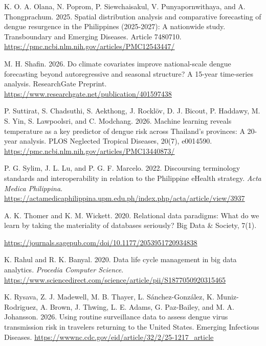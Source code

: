 \documentclass[
]{article}
\begin{document}
K. O. A. Olana, N. Poprom, P. Siewchaisakul, V. Punyapornwithaya, and A.
Thongprachum. 2025. Spatial distribution analysis and comparative
forecasting of dengue resurgence in the Philippines (2025-2027): A
nationwide study. Transboundary and Emerging Diseases. Article 7480710.
\href{https://pmc.ncbi.nlm.nih.gov/articles/PMC12543447/}{\ul{https://pmc.ncbi.nlm.nih.gov/articles/PMC12543447/}}

M. H. Shafin. 2026. Do climate covariates improve national-scale dengue
forecasting beyond autoregressive and seasonal structure? A 15-year
time-series analysis. ResearchGate Preprint.
\href{https://www.researchgate.net/publication/401597438}{\ul{https://www.researchgate.net/publication/401597438}}

P. Suttirat, S. Chadsuthi, S. Aekthong, J. Rocklöv, D. J. Bicout, P.
Haddawy, M. S. Yin, S. Lawpoolsri, and C. Modchang. 2026. Machine
learning reveals temperature as a key predictor of dengue risk across
Thailand's provinces: A 20-year analysis. PLOS Neglected Tropical
Diseases, 20(7), e0014590.
\href{https://pmc.ncbi.nlm.nih.gov/articles/PMC13440873/}{\ul{https://pmc.ncbi.nlm.nih.gov/articles/PMC13440873/}}

P. G. Sylim, J. L. Lu, and P. G. F. Marcelo. 2022. Discoursing
terminology standards and interoperability in relation to the Philippine
eHealth strategy. \emph{Acta Medica Philippina}.
\href{https://actamedicaphilippina.upm.edu.ph/index.php/acta/article/view/3937}{\ul{https://actamedicaphilippina.upm.edu.ph/index.php/acta/article/view/3937}}

A. K. Thomer and K. M. Wickett. 2020. Relational data paradigms: What do
we learn by taking the materiality of databases seriously? Big Data \&
Society, 7(1).

\href{https://journals.sagepub.com/doi/10.1177/2053951720934838}{\ul{https://journals.sagepub.com/doi/10.1177/2053951720934838}}

K. Rahul and R. K. Banyal. 2020. Data life cycle management in big data
analytics. \emph{Procedia Computer Science}.
\href{https://www.sciencedirect.com/science/article/pii/S1877050920315465}{\ul{https://www.sciencedirect.com/science/article/pii/S1877050920315465}}

K. Rysava, Z. J. Madewell, M. B. Thayer, L. Sánchez-González, K.
Muniz-Rodriguez, A. Brown, J. Thwing, L. E. Adams, G. Paz-Bailey, and M.
A. Johansson. 2026. Using routine surveillance data to assess dengue
virus transmission risk in travelers returning to the United States.
Emerging Infectious Diseases.
\href{https://wwwnc.cdc.gov/eid/article/32/2/25-1217_article}{\ul{https://wwwnc.cdc.gov/eid/article/32/2/25-1217\_article}}
\end{document}
